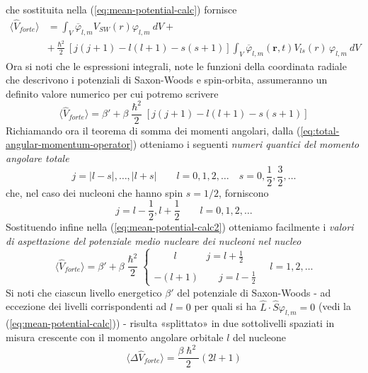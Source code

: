 che sostituita nella (\ref{eq:mean-potential-calc}) fornisce
\begin{align*}
	\langle \hat{V}_{forte} \rangle & = \int_{V} \overline{\varphi}_{l,m} V_{SW}(r)\varphi_{l,m} \ dV + \\
	&+\frac{\hslash^{2}}{2} [j(j+1) - l(l+1) -s(s+1) ]
	\int_{V}\overline{\varphi}_{l,m}(\bm{r},t) V_{ls}(r)\,  \varphi_{l,m} \ dV
\end{align*}
Ora si noti che le espressioni integrali, note le funzioni della coordinata radiale che descrivono i potenziali di Saxon-Woods e spin-orbita, assumeranno un definito valore numerico per cui potremo scrivere
\begin{equation}
	\langle \hat{V}_{forte} \rangle = \beta' + \beta\frac{\hslash^{2}}{2} [j(j+1) - l(l+1) -s(s+1) ]
	\label{eq:mean-potential-calc2}
\end{equation}
Richiamando ora il teorema di somma dei momenti angolari, dalla (\ref{eq:total-angular-momentum-operator}) otteniamo i seguenti \emph{numeri quantici del momento angolare totale}
\[
	j = |l-s|, \dots , |l+s| \qquad l = 0,1,2,\dots \quad s = 0, \frac{1}{2}, \frac{3}{2}, \dots
\]
che, nel caso dei nucleoni che hanno spin $s=1/2$, forniscono
\[
	j = l - \frac{1}{2}, l + \frac{1}{2} \qquad l = 0,1,2,\dots
\]
Sostituendo infine nella (\ref{eq:mean-potential-calc2}) otteniamo facilmente i \emph{valori di aspettazione del potenziale medio nucleare dei nucleoni nel nucleo}
\begin{equation}
	\langle \hat{V}_{forte} \rangle = \beta' + \beta\frac{\hslash^{2}}{2}
	\begin{cases}
		\qquad l \qquad \quad j = l+\frac{1}{2} \\ \\
		-(l+1) \qquad j = l -\frac{1}{2}
	\end{cases}
	\quad l = 1,2,\dots
	\label{eq:expected-value-shell-model-potential}
\end{equation}
Si noti che ciascun livello energetico $\beta'$ del potenziale di Saxon-Woods - ad eccezione dei livelli corrispondenti ad $l=0$ per quali si ha $\hat{L} \cdot \hat{S} \varphi_{l,m} = 0$ (vedi la (\ref{eq:mean-potential-calc})) - risulta «splittato» in due sottolivelli spaziati in misura crescente con il momento angolare orbitale $l$ del nucleone
\begin{equation}
	\langle \Delta \hat{V}_{forte} \rangle = \frac{\beta \hslash^{2}}{2}(2l+1)
	\label{eq:saxon-woods-potential-energy-levels-splitting}
\end{equation}
